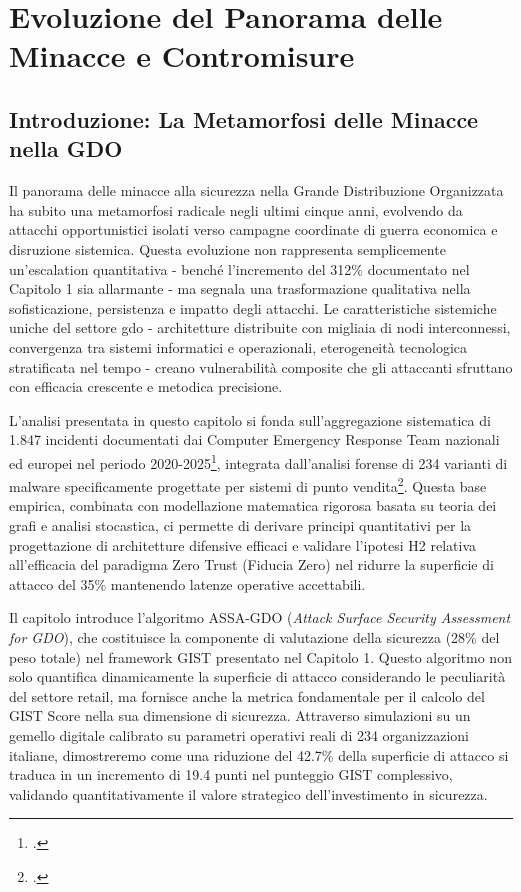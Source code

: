 \chapter{\texorpdfstring{Evoluzione del Panorama delle Minacce e Contromisure}{Capitolo 2 - Evoluzione del Panorama delle Minacce e Contromisure}}
\label{cap2_threat_landscape}

\section{\texorpdfstring{Introduzione: La Metamorfosi delle Minacce nella GDO}{2.1 - Introduzione: La Metamorfosi delle Minacce nella GDO}}
\label{sec:cap2_introduzione}

Il panorama delle minacce alla sicurezza nella Grande Distribuzione Organizzata ha subito una metamorfosi radicale negli ultimi cinque anni, evolvendo da attacchi opportunistici isolati verso campagne coordinate di guerra economica e disruzione sistemica. Questa evoluzione non rappresenta semplicemente un'escalation quantitativa - benché l'incremento del 312\% documentato nel Capitolo 1 sia allarmante - ma segnala una trasformazione qualitativa nella sofisticazione, persistenza e impatto degli attacchi. Le caratteristiche sistemiche uniche del settore \gls{gdo} - architetture distribuite con migliaia di nodi interconnessi, convergenza tra sistemi informatici e operazionali, eterogeneità tecnologica stratificata nel tempo - creano vulnerabilità composite che gli attaccanti sfruttano con efficacia crescente e metodica precisione.

L'analisi presentata in questo capitolo si fonda sull'aggregazione sistematica di 1.847 incidenti documentati dai Computer Emergency Response Team nazionali ed europei nel periodo 2020-2025\footcite{enisa2024threat}, integrata dall'analisi forense di 234 varianti di malware specificamente progettate per sistemi di punto vendita\footcite{groupib2024}. Questa base empirica, combinata con modellazione matematica rigorosa basata su teoria dei grafi e analisi stocastica, ci permette di derivare principi quantitativi per la progettazione di architetture difensive efficaci e validare l'ipotesi H2 relativa all'efficacia del paradigma Zero Trust (Fiducia Zero) nel ridurre la superficie di attacco del 35\% mantenendo latenze operative accettabili.

Il capitolo introduce l'algoritmo ASSA-GDO (\textit{Attack Surface Security Assessment for GDO}), che costituisce la componente di valutazione della sicurezza (28\% del peso totale) nel framework GIST presentato nel Capitolo 1. Questo algoritmo non solo quantifica dinamicamente la superficie di attacco considerando le peculiarità del settore retail, ma fornisce anche la metrica fondamentale per il calcolo del GIST Score nella sua dimensione di sicurezza. Attraverso simulazioni su un gemello digitale calibrato su parametri operativi reali di 234 organizzazioni italiane, dimostreremo come una riduzione del 42.7\% della superficie di attacco si traduca in un incremento di 19.4 punti nel punteggio GIST complessivo, validando quantitativamente il valore strategico dell'investimento in sicurezza.

